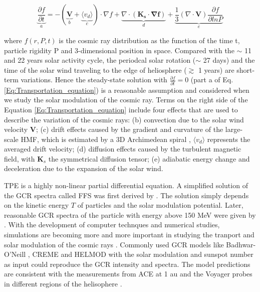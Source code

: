 	\begin{equation}
		\underbrace{\frac{\partial f}{\partial t}}_{a} = - ( \underbrace{\boldsymbol{V}}_{b} + \underbrace{\langle v_d \rangle }_{c}) \cdot \nabla f + \underbrace{\nabla \cdot (\boldsymbol{K_s \cdot \nabla f})}_{d} + \underbrace{\frac{1}{3}(\nabla \cdot \boldsymbol{V}) \frac{\partial f}{\partial ln P}}_{e}
		\label{Eq:Transportation_equation}
	\end{equation}

where $f(r, P, t)$ is the cosmic ray distribution as the function of the time t, particle rigidity P and 3-dimensional position in space. Compared with the $\sim$ 11  and 22 years solar activity cycle, the periodcal solar rotation ($\sim$ 27 days) and  the time of the solar wind traveling to the edge of heliosphere ($\gtrsim$ 1 years) are short-term variations. Hence the steady-state solution with  $\frac{\partial f}{\partial t} = 0$ (part a of Eq.\ref{Eq:Transportation_equation}) is a reasonable assumption and considered when we study the solar modulation of the cosmic ray. Terms on the right side of the Equation \ref{Eq:Transportation_equation} include four effects that are used to describe the variation of the cosmic rays: (b) convection due to the solar wind velocity $\boldsymbol{V}$; (c) drift effects caused by the gradient and curvature of the large-scale \ac{HMF}, which is estimated by a 3D Archimedean spiral \citep{Parker-1958}, $\langle v_d \rangle$ represents the averaged drift velocity; (d) diffusion effects caused by the turbulent magnetic field, with $\boldsymbol{K}_s$ the symmetrical diffusion tensor; (e) adiabatic energy change and deceleration due to the expansion of the solar wind. 

\ac{TPE} is a highly non-linear partial differential equation. A simplified solution of the \ac{GCR} spectra called \ac{FFS} was first derived by \citet{Gleeson1967ApJ, Gleeson1968ApJ}. The solution simply depends on the kinetic energy $T$ of particles and the solar modulation potential. Later, reasonable \ac{GCR} spectra of the particle with energy above 150 MeV were given by \citet{Gleeson1973ApSS}.
With the development of computer technques and numerical studies, simulations are becoming more and more important in studying the tranport and solar modulation of the cosmic rays \citep{Jokipii1979ApJ, LeRoux1995ApJ, Manuel2011AdSpR, Potgieter2013LRSP, Vos2015ApJ, Vos2016SoPh,Boschini2019AdSpR, Boschini2022AdSpR, 
Corti2019ApJ, Shen2019ApJ}. 
Commonly used \ac{GCR} models like Badhwar-O'Neill \citep{Oneill2006AdSpR,ONeill2015, Slaba2020SpWea}, CREME \citep{Tylka1997ITNS,Weller2010ITNS} and HELMOD \citep{Boschini2018AdSpR} with the solar modulation and sunspot number as input could reproduce the GCR intensity and spectra. The model predictions are consistent with the measurements from \ac{ACE} at 1 au and the Voyager probes in different regions of the helisophere \citep{Boschini2019AdSpR}.

